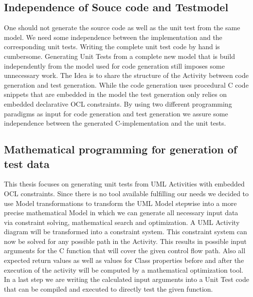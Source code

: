 \subsection{Independence of Souce code and Testmodel}
One should not generate the source code as well as the unit test from the same model. We need some independence between the implementation and the corresponding unit tests. Writing the complete unit test code by hand is cumbersome. Generating Unit Tests from a complete new model that is build independently from the model used for code generation still imposes some unnecessary work. The Idea is to share the structure of the Activity between code generation and test generation. While the code generation uses procedural C code snippets that are embedded in the model the test generation only relies on embedded declarative OCL constraints. By using two different programming paradigms as input for code generation and test generation we assure some independence between the generated C-implementation and the unit tests.
\subsection{Mathematical programming for generation of test data}
This thesis focuses on generating unit tests from UML Activities with embedded OCL constraints.
Since there is no tool available fulfilling our needs we decided to use Model transformations to transform the UML Model stepwise into a more precise mathematical Model in which we can generate all necessary input data via constraint solving, mathematical search and optimization. A UML Activity diagram will be transformed into a constraint system. This constraint system can now be solved for any possible path in the Activity. This results in possible input arguments for the C function that will cover the given control flow path. Also all expected return values as well as values for Class properties before and after the execution of the activity will be computed by a mathematical optimization tool. In a last step we are writing the calculated input arguments into a Unit Test code that can be compiled and executed to directly test the given function.


